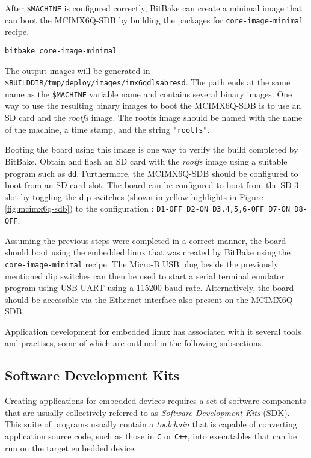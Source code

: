 After \texttt{\$MACHINE} is configured correctly, BitBake can create a minimal image that can boot the MCIMX6Q-SDB by building the packages for \texttt{core-image-minimal} recipe.

\begin{verbatim}
bitbake core-image-minimal
\end{verbatim}

The output images will be generated in \texttt{\$BUILDDIR/tmp/deploy/images/imx6qdlsabresd}. The path ends at the same name as the \texttt{\$MACHINE} variable name and contains several binary images. One way to use the resulting binary images to boot the MCIMX6Q-SDB is to use an SD card and the \textit{rootfs} image. The rootfs image should be named with the name of the machine, a time stamp, and the string \texttt{"rootfs"}.

Booting the board using this image is one way to verify the build completed by BitBake. Obtain and flash an SD card with the \textit{rootfs} image using a suitable program such as \texttt{dd}. Furthermore, the MCIMX6Q-SDB should be configured to boot from an SD card slot. The board can be configured to boot from the SD-3 slot by toggling the dip switches (shown in yellow highlights in Figure \ref{fig:mcimx6q-sdb}) to the configuration : \texttt{D1-OFF D2-ON D3,4,5,6-OFF D7-ON D8-OFF}.

Assuming the previous steps were completed in a correct manner, the board should boot using the embedded linux that was created by BitBake using the \texttt{core-image-minimal} recipe. The Micro-B USB plug beside the previously mentioned dip switches can then be used to start a serial terminal emulator program using USB UART using a 115200 baud rate. Alternatively, the board should be accessible via the Ethernet interface also present on the MCIMX6Q-SDB.




Application development for embedded linux has associated with it several tools and practises, some of which are outlined in the following subsections.

\subsection{Software Development Kits}

Creating applications for embedded devices requires a set of software components that are usually collectively referred to as \textit{Software Development Kits} (SDK). This suite of programs usually contain a \textit{toolchain} that is capable of converting application source code, such as those in \texttt{C}  or \texttt{C++}, into executables that can be run on the target embedded device.

